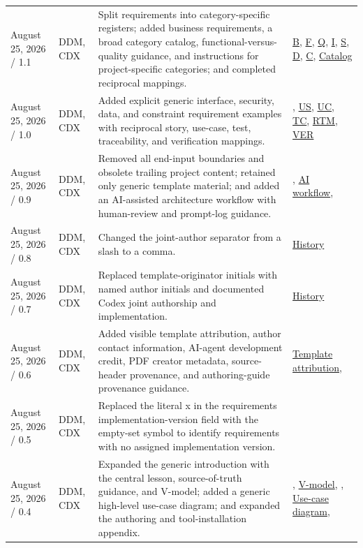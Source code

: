 \begin{tabularx}{\linewidth}{L{3.1cm}L{2.2cm}YL{2.0cm}}
August 25, 2026 / 1.1 & DDM, CDX & Split requirements into category-specific registers; added business requirements, a broad category catalog, functional-versus-quality guidance, and instructions for project-specific categories; and completed reciprocal mappings. & \hyperref[Table:BusinessRequirements]{B}, \hyperref[Table:FunctionalRequirements]{F}, \hyperref[Table:QualityRequirements]{Q}, \hyperref[Table:InterfaceRequirements]{I}, \hyperref[Table:SecurityRequirements]{S}, \hyperref[Table:DataRequirements]{D}, \hyperref[Table:ConstraintRequirements]{C}, \hyperref[Table:RequirementCategoryCatalog]{Catalog}\\
August 25, 2026 / 1.0 & DDM, CDX & Added explicit generic interface, security, data, and constraint requirement examples with reciprocal story, use-case, test, traceability, and verification mappings. & , \hyperref[Table:UserStories]{US}, \hyperref[Chapter:UseCases]{UC}, \hyperref[Chapter:Tests]{TC}, \hyperref[Table:TraceabilityMatrix]{RTM}, \hyperref[Table:VerificationRegister]{VER}\\
August 25, 2026 / 0.9 & DDM, CDX & Removed all end-input boundaries and obsolete trailing project content; retained only generic template material; and added an AI-assisted architecture workflow with human-review and prompt-log guidance. & , \hyperref[Section:AIArchitectureWorkflow]{AI workflow}, \\
August 25, 2026 / 0.8 & DDM, CDX & Changed the joint-author separator from a slash to a comma. & \hyperref[Table:DocumentHistory]{History}\\
August 25, 2026 / 0.7 & DDM, CDX & Replaced template-originator initials with named author initials and documented Codex joint authorship and implementation. & \hyperref[Table:DocumentHistory]{History}\\
August 25, 2026 / 0.6 & DDM, CDX & Added visible template attribution, author contact information, AI-agent development credit, PDF creator metadata, source-header provenance, and authoring-guide provenance guidance. & \hyperref[Chapter:TemplateAttribution]{Template attribution}, \\
August 25, 2026 / 0.5 & DDM, CDX & Replaced the literal x in the requirements implementation-version field with the empty-set symbol to identify requirements with no assigned implementation version. & \\
August 25, 2026 / 0.4 & DDM, CDX & Expanded the generic introduction with the central lesson, source-of-truth guidance, and V-model; added a generic high-level use-case diagram; and expanded the authoring and tool-installation appendix. & , \hyperref[Figure:VModel]{V-model}, , \hyperref[Figure:UseCaseDiagram]{Use-case diagram}, \\

\end{tabularx}
